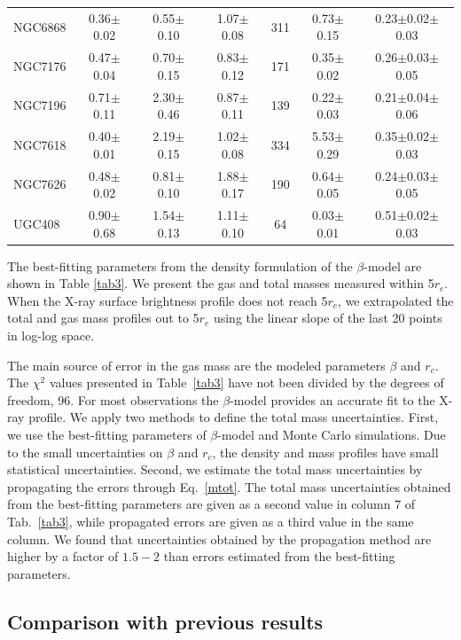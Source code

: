 \documentclass[iop]{emulateapj}
\begin{document}
\begin{table}
\begin{tabular}{lcccccc}
NGC6868 & 0.36$\pm$0.02 & 0.55$\pm$0.10 & 1.07$\pm$0.08 & 311 & 0.73$\pm$0.15 & 0.23$\pm$0.02$\pm$0.03    \\
NGC7176 & 0.47$\pm$0.04 & 0.70$\pm$0.15 & 0.83$\pm$0.12 & 171 & 0.35$\pm$0.02 & 0.26$\pm$0.03$\pm$0.05   \\
NGC7196 & 0.71$\pm$0.11 & 2.30$\pm$0.46 & 0.87$\pm$0.11 & 139 & 0.22$\pm$0.03 & 0.21$\pm$0.04$\pm$0.06    \\ 
NGC7618 & 0.40$\pm$0.01 & 2.19$\pm$0.15 & 1.02$\pm$0.08 & 334 & 5.53$\pm$0.29 & 0.35$\pm$0.02$\pm$0.03   \\
NGC7626 & 0.48$\pm$0.02 & 0.81$\pm$0.10 & 1.88$\pm$0.17 & 190 & 0.64$\pm$0.05 & 0.24$\pm$0.03$\pm$0.05   \\
UGC408  & 0.90$\pm$0.68 & 1.54$\pm$0.13 & 1.11$\pm$0.10 & 64 & 0.03$\pm$0.01 & 0.51$\pm$0.02$\pm$0.03  \\
\hline
\end{tabular}
\end{table}

The best-fitting parameters from the density formulation of the $\beta$-model are shown in Table \ref{tab3}. We present the gas and total masses measured within 5$r_e$. When the X-ray surface brightness profile does not reach 5$r_e$, we extrapolated the total and gas mass profiles out to 5$r_e$ using the linear slope of the last 20 points in log-log space.

The main source of error in the gas mass are the modeled parameters $\beta$ and $r_c$.  The $\chi^2$ values presented in Table~\ref{tab3} have not been divided by the degrees of freedom, 96. For most observations the $\beta$-model provides an accurate fit to the X-ray profile. We apply two methods to define the total mass uncertainties. First, we use the best-fitting parameters of $\beta$-model and Monte Carlo simulations. Due to the small uncertainties on $\beta$ and $r_c$, the density and mass profiles have small statistical uncertainties. Second, we estimate the total mass uncertainties by propagating the errors through Eq.~\ref{mtot}. The total mass uncertainties obtained from the best-fitting parameters are given as a second value in column 7 of Tab.~\ref{tab3}, while propagated errors are given as a third value in the same column. We found that uncertainties obtained by the propagation method are higher by a factor of $1.5-2$ than errors estimated from the best-fitting parameters.

\subsection{Comparison with previous results}\label{subs_comp}
\end{document}
